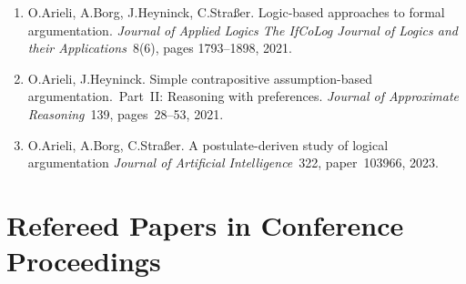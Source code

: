 \documentclass{article}
\begin{document}
\begin{enumerate}
  \item O.Arieli, A.Borg, J.Heyninck, C.Stra{\ss}er.
          Logic-based approaches to formal argumentation.
          {\em Journal of Applied Logics The IfCoLog Journal of Logics and their Applications\/}~8(6),
          pages 1793--1898, 2021.

  \item O.Arieli, J.Heyninck.
           Simple contrapositive assumption-based argumentation.\ Part~II: Reasoning with preferences.
           {\em Journal of Approximate Reasoning\/}~139, pages~28--53, 2021.

  \item O.Arieli, A.Borg, C.Stra{\ss}er. 
           A postulate-deriven study of logical argumentation  
           {\em Journal of Artificial Intelligence\/}~322, paper~103966, 2023.

\end{enumerate}


\section*{Refereed Papers in Conference Proceedings}
\end{document}

